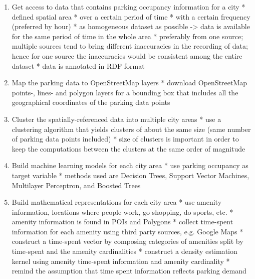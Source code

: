 \documentclass{article}
\begin{document}
		\begin{enumerate}[label=\Roman*]
		
		
		
		\item{Get access to data that contains parking occupancy information for a city}
		* defined spatial area
		* over a certain period of time
		* with a certain frequency (preferred by hour)
		* as homogeneous dataset as possible -> data is available for the same period of time in the whole area
		* preferably from one source; multiple sources tend to bring different inaccuracies in the recording of data; hence for one source the inaccuracies would be consistent among the entire dataset
		* data is annotated in RDF format
		
		\item{Map the parking data to OpenStreetMap layers}
		* download OpenStreetMap points-, lines- and polygon layers for a bounding box that includes all the geographical coordinates of the parking data points
		
	
		\item{Cluster the spatially-referenced data into multiple city areas}
		* use a clustering algorithm that yields clusters of about the same size (same number of parking data points included)
		* size of clusters is important in order to keep the computations between the clusters at the same order of magnitude
		
		
		\item{Build machine learning models for each city area}
		* use parking occupancy as target variable
		* methods used are Decision Trees, Support Vector Machines, Multilayer Perceptron, and Boosted Trees
					
		\item{Build mathematical representations for each city area}
		* use amenity information, locations where people work, go shopping, do sports, etc. 
		* amenity information is found in POIs and Polygons
		* collect time-spent information for each amenity using third party sources, e.g. Google Maps
		* construct a time-spent vector by composing categories of amenities split by time-spent and the amenity cardinalities
		* construct a density estimation kernel using amenity time-spent information and amenity cardinality 
		* remind the assumption that time spent information reflects parking demand
			

\end{enumerate}
\end{document}
